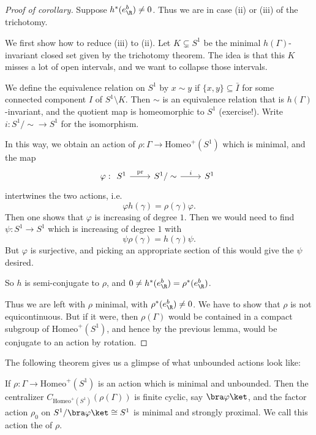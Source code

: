 \documentclass[a4paper]{article}
\newcommand\Homeo{\mathrm{Homeo}}
\begin{document}
\begin{proof}[Proof of corollary]
  Suppose $h^*(e^b_\R) \not= 0$. Thus we are in case (ii) or (iii) of the trichotomy.

  We first show how to reduce (iii) to (ii). Let $K \subsetneq S^1$ be the minimal $h(\Gamma)$-invariant closed set given by the trichotomy theorem. The idea is that this $K$ misses a lot of open intervals, and we want to collapse those intervals.

  We define the equivalence relation on $S^1$ by $x \sim y$ if $\{x, y\} \subseteq \bar{I}$ for some connected component $I$ of $S^1 \setminus K$. Then $\sim$ is an equivalence relation that is $h(\Gamma)$-invariant, and the quotient map is homeomorphic to $S^1$ (exercise!). Write $i: S^1/\sim \to S^1$ for the isomorphism.

  In this way, we obtain an action of $\rho: \Gamma \to \Homeo^+(S^1)$ which is minimal, and the map
  \[
    \varphi:
    \begin{tikzcd}
      S^1 \ar[r, "\mathrm{pr}"] & S^1/\sim \ar[r, "i"] & S^1
    \end{tikzcd}
  \]
  intertwines the two actions, i.e.
  \[
    \varphi h(\gamma) = \rho(\gamma) \varphi.
  \]
  Then one shows that $\varphi$ is increasing of degree $1$. Then we would need to find $\psi: S^1 \to S^1$ which is increasing of degree $1$ with
  \[
    \psi \rho(\gamma) = h(\gamma) \psi.
  \]
  But $\varphi$ is surjective, and picking an appropriate section of this would give the $\psi$ desired.

  So $h$ is semi-conjugate to $\rho$, and $0 \not= h^*(e^b_\R) = \rho^*(e^b_\R)$.

  Thus we are left with $\rho$ minimal, with $\rho^*(e^b_\R) \not= 0$. We have to show that $\rho$ is not equicontinuous. But if it were, then $\rho(\Gamma)$ would be contained in a compact subgroup of $\Homeo^+(S^1)$, and hence by the previous lemma, would be conjugate to an action by rotation.
\end{proof}

The following theorem gives us a glimpse of what unbounded actions look like:
\begin{thm}
  If $\rho: \Gamma \to \Homeo^+(S^1)$ is an action which is minimal and unbounded. Then the centralizer $C_{\Homeo^+(S^1)}(\rho(\Gamma))$ is finite cyclic, say $\bra \varphi\ket$, and the factor action $\rho_0$ on $S^1/\bra \varphi\ket \cong S^1$ is minimal and strongly proximal. We call this action the  of $\rho$.
\end{thm}
\end{document}
